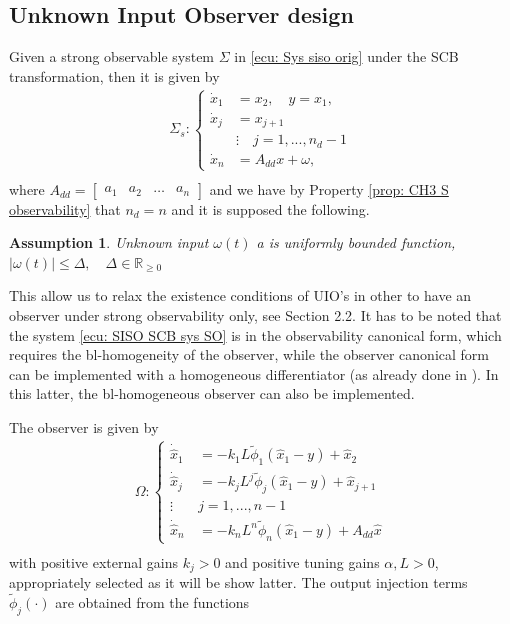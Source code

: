 \documentclass[11pt,letterpaper,twoside,openright]{report}
\newcommand{\RE}{\mathbb{R}}
\newtheorem{assumtion}{Assumption}[chapter]
\begin{document}
\subsection{Unknown Input Observer design}
Given a strong observable system $\Sigma$ in \eqref{ecu: Sys siso orig} under the SCB transformation, then it is given by
\begin{equation}
	\begin{split}\label{ecu: SISO SCB sys SO}
		\Sigma_s: \left\{
		\begin{array}{rl}
		\dot{x}_{1} &= x_{2}, \quad y=x_{1}, \\
		\dot{x}_{j} &= x_{j+1} \\
		& \vdots \quad j=1,...,n_{d}-1\\
		\dot{x}_{n} &= A_{dd}x + \omega, 
		\end{array}
		\right. \\
	\end{split}
\end{equation}
where $A_{dd}= \begin{bmatrix}  a_{1} & a_{2} & \hdots & a_{n} \end{bmatrix}$ and we have by Property \ref{prop: CH3 S observability} that $n_d=n$ and it is supposed the following.
\begin{assumtion}\label{Assum: omega}
	Unknown input $\omega(t)$ a is uniformly bounded function, $|\omega(t)|\leq \Delta, \quad \Delta \in \RE_{\geq 0}$
\end{assumtion}
This allow us to relax the existence conditions of UIO's in other to have an observer under strong observability only, see Section 2.2. It has to be noted that the system \eqref{ecu: SISO SCB sys SO} is in the observability canonical form, which requires the bl-homogeneity of the observer, while the observer canonical form can be implemented with a homogeneous differentiator (as already done in \cite{Niederwieser2021}). In this latter, the bl-homogeneous observer can also be implemented.

The observer is given by
\begin{equation}\label{ecu: Obs SISO}
	\begin{split}
	\Omega: \left\{
	\begin{array}{rl}
		\dot{\hat{x}}_{1} &= -k_{1}L \tilde{\phi}_{1}( \hat{x}_{1}-y ) + \hat{x}_2 \\
		\dot{\hat{x}}_{j} &= -k_{j}L^{j}\tilde{\phi}_{j}( \hat{x}_{1}-y ) + \hat{x}_{j+1} \\
		\vdots \quad & j=1,...,n-1\\
		\dot{\hat{x}}_{n} &= -k_{n}L^{n} \tilde{\phi}_{n}( \hat{x}_{1}-y ) + A_{dd}\hat{x}
	\end{array}
	\right. \\
	\end{split}
\end{equation}
with positive external gains $k_j>0$ and positive tuning gains $\alpha,L >0$, appropriately selected as it will be show latter. The output injection terms $\tilde{\phi}_{j}(\cdot)$ are obtained from the functions
\end{document}
